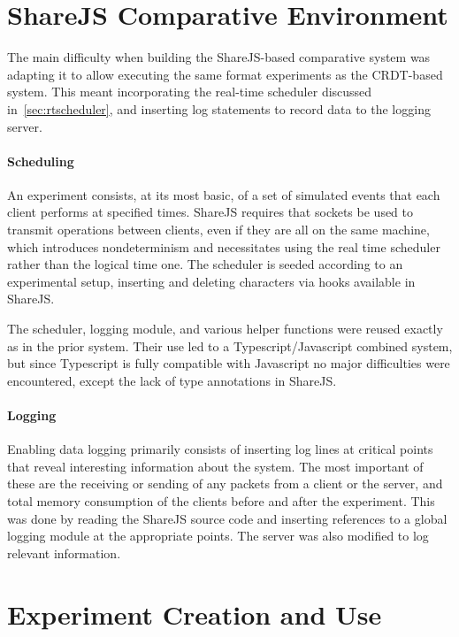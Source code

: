 \documentclass[12pt,a4paper,twoside,openright]{report}
\begin{document}
	
	
\section{ShareJS Comparative Environment} \label{sec:comparative}

	The main difficulty when building the ShareJS-based comparative system was adapting it to allow executing the same format experiments as the CRDT-based system. This meant incorporating the real-time scheduler discussed in~\cref{sec:rtscheduler}, and inserting log statements to record data to the logging server.
	
	\paragraph{Scheduling}
	An experiment consists, at its most basic, of a set of simulated events that each client performs at specified times. ShareJS requires that sockets be used to transmit operations between clients, even if they are all on the same machine, which introduces nondeterminism and necessitates using the real time scheduler rather than the logical time one. The scheduler is seeded according to an experimental setup, inserting and deleting characters via hooks available in ShareJS.
	
	The scheduler, logging module, and various helper functions were reused exactly as in the prior system. Their use led to a Typescript/Javascript combined system, but since Typescript is fully compatible with Javascript no major difficulties were encountered, except the lack of type annotations in ShareJS.
	
	\paragraph{Logging}
	Enabling data logging primarily consists of inserting log lines at critical points that reveal interesting information about the system. The most important of these are the receiving or sending of any packets from a client or the server, and total memory consumption of the clients before and after the experiment. This was done by reading the ShareJS source code and inserting references to a global logging module at the appropriate points. The server was also modified to log relevant information.
	
\section{Experiment Creation and Use} \label{sec:experimentcreation}
\end{document}
